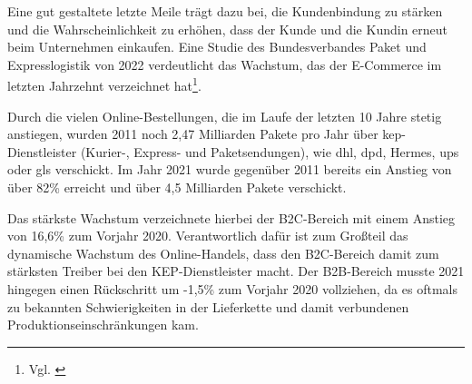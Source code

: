 Eine gut gestaltete letzte Meile trägt dazu bei, die Kundenbindung zu stärken und die Wahrscheinlichkeit zu erhöhen, dass der Kunde und die Kundin erneut beim Unternehmen einkaufen.
Eine Studie des Bundesverbandes Paket und Expresslogistik von 2022 verdeutlicht das Wachstum, das der E-Commerce im letzten Jahrzehnt verzeichnet hat\footnote{Vgl. \autocite [Online] {Bundesverband2021}}.
\newline

Durch die vielen Online-Bestellungen, die im Laufe der letzten 10 Jahre stetig anstiegen, wurden 2011 noch 2,47 Milliarden Pakete pro Jahr über \ac{kep}-Dienstleister (Kurier-, Express- und Paketsendungen), wie \ac{dhl}, \ac{dpd}, Hermes, \ac{ups} oder \ac{gls} verschickt. Im Jahr 2021 wurde gegenüber 2011 bereits ein Anstieg von über 82\% erreicht und über 4,5 Milliarden Pakete verschickt.
\newline

Das stärkste Wachstum verzeichnete hierbei der B2C-Bereich mit einem Anstieg von 16,6\% zum Vorjahr 2020. Verantwortlich dafür ist zum Großteil das dynamische Wachstum des Online-Handels, dass den B2C-Bereich damit zum stärksten Treiber bei den KEP-Dienstleister macht. Der B2B-Bereich musste 2021 hingegen einen Rückschritt um -1,5\% zum Vorjahr 2020 vollziehen, da es oftmals zu bekannten Schwierigkeiten in der Lieferkette und damit verbundenen Produktionseinschränkungen kam.